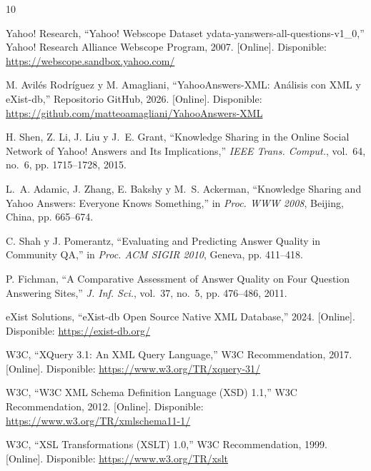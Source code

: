 \documentclass[10pt,twocolumn,a4paper]{article}
\begin{document}
\begin{thebibliography}{10}

Yahoo! Research,
``Yahoo! Webscope Dataset ydata-yanswers-all-questions-v1\_0,''
Yahoo! Research Alliance Webscope Program, 2007.
[Online]. Disponible: \url{https://webscope.sandbox.yahoo.com/}

M. Avil\'es Rodr\'iguez y M. Amagliani,
``YahooAnswers-XML: An\'alisis con XML y eXist-db,''
Repositorio GitHub, 2026.
[Online]. Disponible: \url{https://github.com/matteoamagliani/YahooAnswers-XML}

H. Shen, Z. Li, J. Liu y J.~E. Grant,
``Knowledge Sharing in the Online Social Network of Yahoo! Answers
and Its Implications,''
\textit{IEEE Trans. Comput.}, vol.~64, no.~6, pp. 1715--1728, 2015.

L.~A. Adamic, J. Zhang, E. Bakshy y M.~S. Ackerman,
``Knowledge Sharing and Yahoo Answers: Everyone Knows Something,''
in \textit{Proc. WWW 2008}, Beijing, China, pp. 665--674.

C. Shah y J. Pomerantz,
``Evaluating and Predicting Answer Quality in Community QA,''
in \textit{Proc. ACM SIGIR 2010}, Geneva, pp. 411--418.

P. Fichman,
``A Comparative Assessment of Answer Quality on Four Question
Answering Sites,''
\textit{J. Inf. Sci.}, vol.~37, no.~5, pp. 476--486, 2011.

eXist Solutions,
``eXist-db Open Source Native XML Database,''
2024. [Online]. Disponible: \url{https://exist-db.org/}

W3C,
``XQuery 3.1: An XML Query Language,''
W3C Recommendation, 2017.
[Online]. Disponible: \url{https://www.w3.org/TR/xquery-31/}

W3C,
``W3C XML Schema Definition Language (XSD) 1.1,''
W3C Recommendation, 2012.
[Online]. Disponible: \url{https://www.w3.org/TR/xmlschema11-1/}

W3C,
``XSL Transformations (XSLT) 1.0,''
W3C Recommendation, 1999.
[Online]. Disponible: \url{https://www.w3.org/TR/xslt}

\end{thebibliography}
\end{document}
